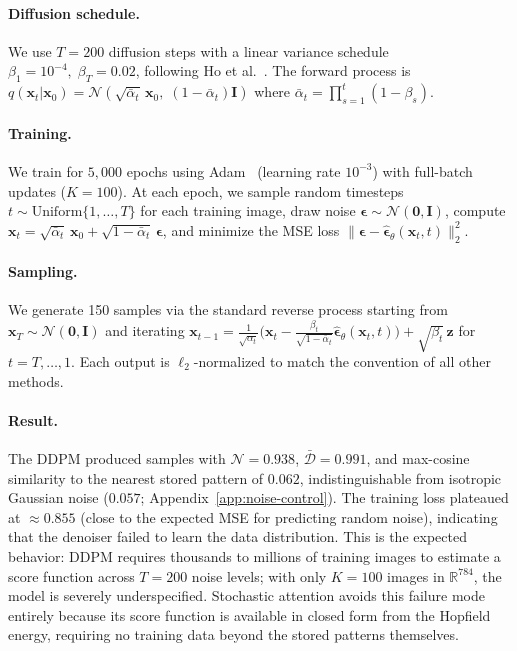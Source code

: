 \paragraph{Diffusion schedule.}
We use $T{=}200$ diffusion steps with a linear variance schedule
$\beta_1{=}10^{-4},\;\beta_T{=}0.02$, following Ho et al.~\cite{hoDenoisingDiffusionProbabilistic2020}.
The forward process is $q(\mathbf{x}_t|\mathbf{x}_0)=\mathcal{N}(\sqrt{\bar\alpha_t}\,\mathbf{x}_0,\;(1{-}\bar\alpha_t)\mathbf{I})$
where $\bar\alpha_t=\prod_{s=1}^{t}(1-\beta_s)$.

\paragraph{Training.}
We train for $5{,}000$ epochs using Adam~\cite{kingmaAdamMethodStochastic2014}
(learning rate $10^{-3}$) with full-batch updates ($K{=}100$).
At each epoch, we sample random timesteps $t\sim\mathrm{Uniform}\{1,\dots,T\}$ for each training
image, draw noise $\boldsymbol{\epsilon}\sim\mathcal{N}(\mathbf{0},\mathbf{I})$, compute
$\mathbf{x}_t=\sqrt{\bar\alpha_t}\,\mathbf{x}_0+\sqrt{1{-}\bar\alpha_t}\,\boldsymbol{\epsilon}$,
and minimize the MSE loss $\lVert\boldsymbol{\epsilon}-\hat{\boldsymbol{\epsilon}}_\theta(\mathbf{x}_t,t)\rVert_2^2$.

\paragraph{Sampling.}
We generate 150 samples via the standard reverse process starting from
$\mathbf{x}_T\sim\mathcal{N}(\mathbf{0},\mathbf{I})$ and iterating
$\mathbf{x}_{t-1}=\frac{1}{\sqrt{\alpha_t}}\bigl(\mathbf{x}_t-\frac{\beta_t}{\sqrt{1-\bar\alpha_t}}\hat{\boldsymbol{\epsilon}}_\theta(\mathbf{x}_t,t)\bigr)+\sqrt{\beta_t}\,\mathbf{z}$
for $t=T,\dots,1$. Each output is $\ell_2$-normalized to match the convention of all other methods.

\paragraph{Result.}
The DDPM produced samples with $\mathcal{N}{=}0.938$, $\bar{\mathcal{D}}{=}0.991$, and
max-cosine similarity to the nearest stored pattern of $0.062$, indistinguishable from
isotropic Gaussian noise ($0.057$; Appendix~\ref{app:noise-control}).
The training loss plateaued at ${\approx}0.855$ (close to the expected MSE for predicting
random noise), indicating that the denoiser failed to learn the data distribution.
This is the expected behavior: DDPM requires thousands to millions of training images to
estimate a score function across $T{=}200$ noise levels; with only $K{=}100$ images in
$\mathbb{R}^{784}$, the model is severely underspecified.
Stochastic attention avoids this failure mode entirely because its score function is available
in closed form from the Hopfield energy, requiring no training data beyond the stored patterns
themselves.

